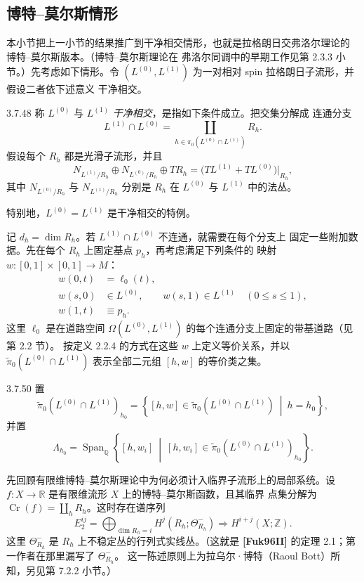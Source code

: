 
\subsection{博特--莫尔斯情形}
\label{subsec:3-7-5}

本小节把上一小节的结果推广到干净相交情形，也就是拉格朗日交弗洛尔理论的
博特--莫尔斯版本。（博特--莫尔斯理论在
弗洛尔同调中的早期工作见第 2.3.3 小节。）先考虑如下情形。令
$(L^{(0)},L^{(1)})$ 为一对相对 spin 拉格朗日子流形，并假设二者依下述意义
干净相交。

\begin{definition}{3.7.48}\label{def:3-7-48}
称 $L^{(0)}$ 与 $L^{(1)}$ \emph{干净相交}，是指如下条件成立。把交集分解成
连通分支
\[
 L^{(1)}\cap L^{(0)}
 =\coprod_{h\in\pi_0(L^{(0)}\cap L^{(1)})}R_h.
\]
假设每个 $R_h$ 都是光滑子流形，并且
\[
 N_{L^{(1)}/R_h}\oplus N_{L^{(0)}/R_h}\oplus TR_h
 =\bigl(TL^{(1)}+TL^{(0)}\bigr)|_{R_h},
\]
其中 $N_{L^{(0)}/R_h}$ 与 $N_{L^{(1)}/R_h}$ 分别是 $R_h$ 在
$L^{(0)}$ 与 $L^{(1)}$ 中的法丛。
\end{definition}

特别地，$L^{(0)}=L^{(1)}$ 是干净相交的特例。

记 $d_h=\dim R_h$。若 $L^{(1)}\cap L^{(0)}$ 不连通，就需要在每个分支上
固定一些附加数据。先在每个 $R_h$ 上固定基点 $p_h$，再考虑满足下列条件的
映射 $w\colon[0,1]\times[0,1]\to M$：
\begin{align}
 w(0,t)&=\ell_0(t),
 \tag{3.7.49.1}\label{eq:3-7-49-1}\\
 w(s,0)&\in L^{(0)},\qquad w(s,1)\in L^{(1)}
 \quad(0\leq s\leq1),
 \tag{3.7.49.2}\label{eq:3-7-49-2}\\
 w(1,t)&\equiv p_h.
 \tag{3.7.49.3}\label{eq:3-7-49-3}
\end{align}
这里 $\ell_0$ 是在道路空间
$\Omega(L^{(0)},L^{(1)})$ 的每个连通分支上固定的带基道路（见第 2.2 节）。
按定义 2.2.4 的方式在这些 $w$ 上定义等价关系，并以
$\widetilde\pi_0(L^{(0)}\cap L^{(1)})$ 表示全部二元组 $[h,w]$ 的等价类之集。

\begin{definition}{3.7.50}\label{def:3-7-50}
置
\[
 \widetilde\pi_0(L^{(0)}\cap L^{(1)})_{h_0}
 =
 \left\{
 [h,w]\in\widetilde\pi_0(L^{(0)}\cap L^{(1)})
 \ \middle|\ h=h_0
 \right\},
\]
并置
\[
 \Lambda_{h_0}
 =
 \operatorname{Span}_{\mathbb Q}
 \left\{
 [h,w_i]\ \middle|\
 [h,w_i]\in
 \widetilde\pi_0(L^{(0)}\cap L^{(1)})_{h_0}
 \right\}.
\]
\end{definition}

先回顾有限维博特--莫尔斯理论中为何必须计入临界子流形上的局部系统。设
$f\colon X\to\mathbb R$ 是有限维流形 $X$ 上的博特--莫尔斯函数，且其临界
点集分解为 $\operatorname{Cr}(f)=\coprod_hR_h$。这时存在谱序列
\[
 E_2^{ij}
 =
 \bigoplus_{\dim R_h=i}H^j(R_h;\Theta^-_{R_h})
 \Longrightarrow H^{i+j}(X;\mathbb Z).
\]
这里 $\Theta^-_{R_h}$ 是 $R_h$ 上不稳定丛的行列式实线丛。（这就是
\textbf{[Fuk96II]} 的定理 2.1；第一作者在那里漏写了 $\Theta^-_{R_h}$。
这一陈述原则上为拉乌尔·博特（Raoul Bott）所知，另见第 7.2.2 小节。）

